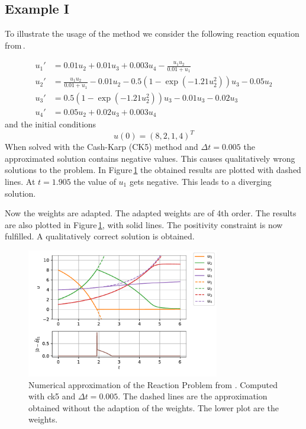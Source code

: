 \documentclass[a4paper]{article}
\numberwithin{equation}{section}
\theoremstyle{plain}
\theoremstyle{definition}
\numberwithin{theorem}{section}
\newcommand{\dt}{{\Delta t}}
\newcommand{\1}{\mathbbm{1}}
\begin{document}
\subsection{Example I}\label{sec:example_reac}

To illustrate the usage of the method we consider the following reaction equation from\,\cite{kopecz_comparison_2019}.

\begin{subequations}
\label{eq:Reaction}
\begin{align}
u_1' &= 0.01u_2 + 0.01 u_3 +0.003u_4 - \frac{u_1 u_2}{0.01+u_1} \\ 
u_2' &= \frac{u_1u_2}{0.01+u_1}-0.01 u_2-0.5(1-\exp(-1.21 u_2^2)) u_3 -0.05 u_2 \\ 
u_3' &= 0.5(1-\exp(-1.21u_2^2)) u_3 - 0.01 u_3 -0.02 u_3 \\ 
u_4' &=0.05 u_2 + 0.02 u_3 + 0.003u_4 
\end{align}
\end{subequations}
and the initial conditions
\begin{equation}
u(0) = (8,2,1,4)^T
\end{equation}
When solved with the Cash-Karp (CK5) method and $\dt = 0.005$ the approximated solution contains negative values. This causes qualitatively wrong solutions to the problem. 
In Figure\,\ref{fig:exampleI} the obtained results are plotted with dashed lines. 
At $t=1.905$ the value of $u_1$ gets negative. This leads to a diverging solution.

Now the weights are adapted. The adapted weights are of 4th order. The results are also plotted in Figure\,\ref{fig:exampleI}, with solid lines. 
The positivity constraint is now fulfilled. A qualitatively correct solution is obtained.

\begin{figure}[h]
    \centering
    \includegraphics[width=0.75\textwidth]{plots/exampleI.pdf}
    \caption{Numerical approximation of the Reaction Problem from \cite{kopecz_comparison_2019}. Computed with ck5 and $\dt = 0.005$. The dashed lines are the approximation obtained without the adaption of the weights. The lower plot are the weights. }
    \label{fig:exampleI}
\end{figure}
\end{document}
